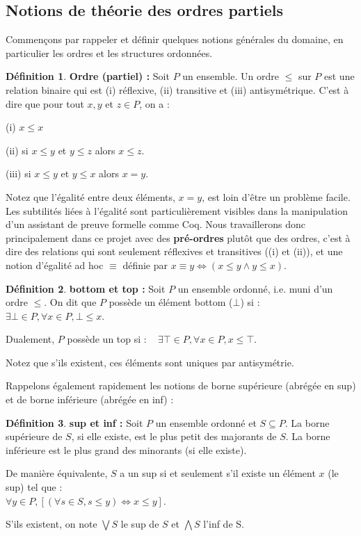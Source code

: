 \documentclass{article}
\theoremstyle{definition}
\newtheorem{definition}{Définition}[section]
\begin{document}
\subsection{Notions de théorie des ordres partiels}

Commençons par rappeler et définir quelques notions générales du domaine, en particulier les ordres et les structures ordonnées.

\begin{definition}{\textbf{Ordre (partiel) : }}
Soit $P$ un ensemble. Un ordre $\leq$ sur $P$ est une relation binaire qui est (i) réflexive, (ii) transitive et (iii) antisymétrique. C'est à dire que pour tout $x, y$ et $z \in P$, on a :

(i) $x \leq x$

(ii) si $x \leq y$ et $y \leq z$ alors $x \leq z$.

(iii) si $x \leq y$ et $y \leq x$ alors $x = y$.
\end{definition}

Notez que l'égalité entre deux éléments, $x = y$, est loin d'être un problème facile. Les subtilités liées à l'égalité sont particulièrement visibles dans la manipulation d'un assistant de preuve formelle comme Coq. Nous travaillerons donc principalement dans ce projet avec des \textbf{pré-ordres} plutôt que des ordres, c'est à dire des relations qui sont seulement réflexives et transitives ((i) et (ii)), et une notion d'égalité ad hoc $\equiv$ définie par $x \equiv y \Longleftrightarrow (x \leq y \wedge y \leq x)$.

\begin{definition}{\textbf{bottom et top : }}
Soit $P$ un ensemble ordonné, i.e. muni d'un ordre $\leq$. On dit que $P$ possède un élément bottom ($\bot$) si : ~ $\exists \bot \in P, \forall x \in P, \bot \leq x$.

\noindent Dualement, $P$ possède un top si : ~ $\exists \top \in P, \forall x \in P, x \leq \top$.

Notez que s'ils existent, ces éléments sont uniques par antisymétrie.
\end{definition}

Rappelons également rapidement les notions de borne supérieure (abrégée en sup) et de borne inférieure (abrégée en inf) :

\begin{definition}{\textbf{sup et inf : }}
Soit $P$ un ensemble ordonné et $S \subseteq P$. La borne supérieure de $S$, si elle existe, est le plus petit des majorants de $S$. La borne inférieure est le plus grand des minorants (si elle existe).

De manière équivalente, $S$ a un sup si et seulement s'il existe un élément $x$ (le sup) tel que :\\ $\forall y \in P,
[(\forall s \in S, s \leq y) \Longleftrightarrow x \leq y]$.

S'ils existent, on note $\bigvee S$ le sup de $S$ et $\bigwedge S$ l'inf de S.
\end{definition}
\end{document}

